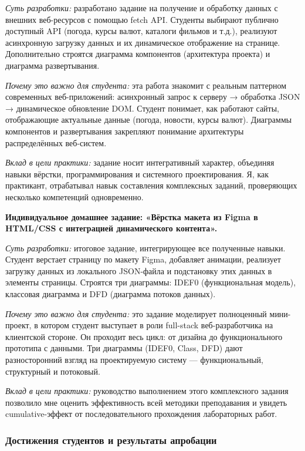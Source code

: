 \textit{Суть разработки:} разработано задание на получение и обработку данных с внешних веб-ресурсов с помощью fetch API. Студенты выбирают публично доступный API (погода, курсы валют, каталоги фильмов и т.д.), реализуют асинхронную загрузку данных и их динамическое отображение на странице. Дополнительно строятся диаграмма компонентов (архитектура проекта) и диаграмма развертывания.

\textit{Почему это важно для студента:} эта работа знакомит с реальным паттерном современных веб-приложений: асинхронный запрос к серверу → обработка JSON → динамическое обновление DOM. Студент понимает, как работают сайты, отображающие актуальные данные (погода, новости, курсы валют). Диаграммы компонентов и развертывания закрепляют понимание архитектуры распределённых веб-систем.

\textit{Вклад в цели практики:} задание носит интегративный характер, объединяя навыки вёрстки, программирования и системного проектирования. Я, как практикант, отрабатывал навык составления комплексных заданий, проверяющих несколько компетенций одновременно.

\vspace{1em}
\textbf{Индивидуальное домашнее задание: «Вёрстка макета из Figma в HTML/CSS с интеграцией динамического контента».}

\textit{Суть разработки:} итоговое задание, интегрирующее все полученные навыки. Студент верстает страницу по макету Figma, добавляет анимации, реализует загрузку данных из локального JSON-файла и подстановку этих данных в элементы страницы. Строятся три диаграммы: IDEF0 (функциональная модель), классовая диаграмма и DFD (диаграмма потоков данных).

\textit{Почему это важно для студента:} это задание моделирует полноценный мини-проект, в котором студент выступает в роли full-stack веб-разработчика на клиентской стороне. Он проходит весь цикл: от дизайна до функционального прототипа с данными. Три диаграммы (IDEF0, Class, DFD) дают разносторонний взгляд на проектируемую систему — функциональный, структурный и потоковый.

\textit{Вклад в цели практики:} руководство выполнением этого комплексного задания позволило мне оценить эффективность всей методики преподавания и увидеть cumulative-эффект от последовательного прохождения лабораторных работ.

\subsubsection{Достижения студентов и результаты апробации}

